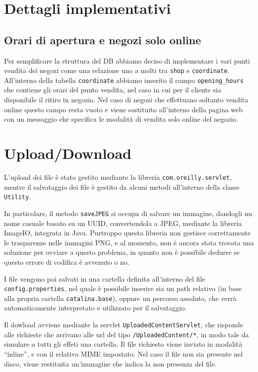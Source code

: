 \chapter{Dettagli implementativi}
\section{Orari di apertura e negozi solo online}
Per semplificare la struttura del DB abbiamo deciso di implementare i vari punti vendita dei negozi come una relazione uno a molti tra \texttt{shop} e \texttt{coordinate}. All'interno della tabella \texttt{coordinate} abbiamo inserito il campo \texttt{opening\_hours} che contiene gli orari del punto vendita, nel caso in cui per il cliente sia disponibile il ritiro in negozio. Nel caso di negozi che effettuano soltanto vendita online questo campo resta vuoto e viene sostituito all'interno della pagina web con un messaggio che specifica le modalità di vendita solo online del negozio.

\chapter{Upload/Download}

L'upload dei file è stato gestito mediante la libreria \texttt{com.oreilly.servlet}, mentre il salvataggio dei file è gestito da alcuni metodi all'interno della classe \texttt{Utility}.

In particolare, il metodo \texttt{saveJPEG} si occupa di salvare un immagine, dandogli un nome casuale basato su un UUID, convertendola a JPEG, mediante la libreria ImageIO, integrata in Java.
Purtroppo questa libreria non gestisce correttamente le trasparenze nelle immagini PNG, e al momento, non è ancora stata trovata una soluzione per ovviare a questo problema, in quanto non è possibile dedurre se questo errore di codifica è avvenuto o no.

I file vengono poi salvati in una cartella definita all'interno del file \texttt{config.properties}, nel quale è possibile inserire sia un path relativo (in base alla propria cartella \texttt{catalina.base}), oppure un percorso assoluto, che verrà automaticamente interpretato e utilizzato per il salvataggio.

Il dowload avviene mediante la servlet \texttt{UploadedContentServlet}, che risponde alle richieste che arrivano alle url del tipo \texttt{/UploadedContent/*}, in modo tale da simulare a tutti gli effeti una cartella. Il file richiesto viene inviato in modalità ``inline'', e con il relativo MIME impostato. Nel caso il file non sia presente nel disco, viene restituita un'immagine che indica la non presenza del file.

